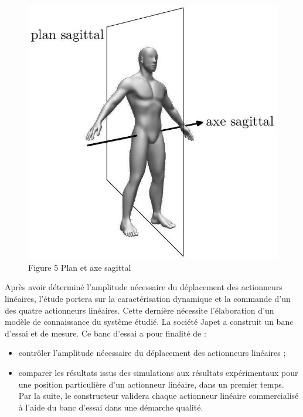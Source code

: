 \documentclass[10pt]{article}
\begin{document}
\begin{figure}[h]
\begin{center}
  \includegraphics[width=\textwidth]{2025_09_16_5f2d7643f7e649c6833dg-04}
\captionsetup{labelformat=empty}
\caption{Figure 5 Plan et axe sagittal}
\end{center}
\end{figure}

Après avoir déterminé l'amplitude nécessaire du déplacement des actionneurs linéaires, l'étude portera sur la caractérisation dynamique et la commande d'un des quatre actionneurs linéaires. Cette dernière nécessite l'élaboration d'un modèle de connaissance du système étudié. La société Japet a construit un banc d'essai et de mesure. Ce banc d'essai a pour finalité de :

\begin{itemize}
  \item contrôler l'amplitude nécessaire du déplacement des actionneurs linéaires ;
  \item comparer les résultats issus des simulations aux résultats expérimentaux pour une position particulière d'un actionneur linéaire, dans un premier temps.\\
Par la suite, le constructeur validera chaque actionneur linéaire commercialisé à l'aide du banc d'essai dans une démarche qualité.
\end{itemize}
\end{document}
